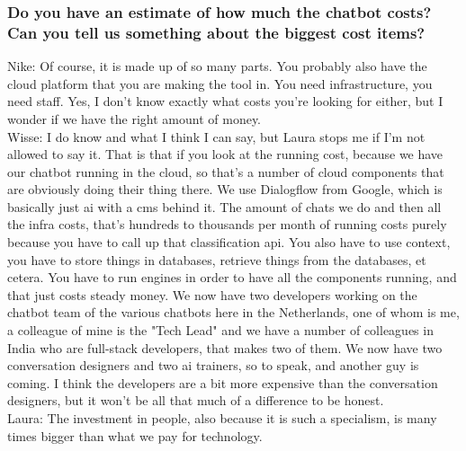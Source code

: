 \begin{appendices}
	\subsubsection{Do you have an estimate of how much the chatbot costs? Can you tell us something about the biggest cost items?}
	Nike: Of course, it is made up of so many parts. You probably also have the cloud platform that you are making the tool in. You need infrastructure, you need staff. Yes, I don't know exactly what costs you're looking for either, but I wonder if we have the right amount of money.\\
	\break
	Wisse: I do know and what I think I can say, but Laura stops me if I'm not allowed to say it. That is that if you look at the running cost, because we have our chatbot running in the cloud, so that's a number of cloud components that are obviously doing their thing there. We use Dialogflow from Google, which is basically just \acrshort{ai} with a \acrfull{cms} behind it. The amount of chats we do and then all the infra costs, that's hundreds to thousands per month of running costs purely because you have to call up that classification \acrfull{api}. You also have to use context, you have to store things in databases, retrieve things from the databases, et cetera. You have to run engines in order to have all the components running, and that just costs steady money. We now have two developers working on the chatbot team of the various chatbots here in the Netherlands, one of whom is me, a colleague of mine is the "Tech Lead" and we have a number of colleagues in India who are full-stack developers, that makes two of them. We now have two conversation designers and two \acrshort{ai} trainers, so to speak, and another guy is coming. I think the developers are a bit more expensive than the conversation designers, but it won't be all that much of a difference to be honest.\\
	\break
	Laura: The investment in people, also because it is such a specialism, is many times bigger than what we pay for technology. \\
	\break

\end{appendices}
